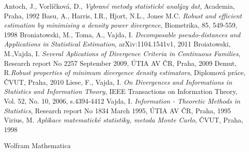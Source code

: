 \begin{thebibliography}{10}

%

Antoch, J., Vorlíčková, D., {\em Vybrané metody statistické analýzy dat}, Academia, Praha, 1992
Basu, A., Harris, I.R., Hjort, N.L., Jones M.C. {\em Robust and efficient estimation by minimising a density power divergence}, Biometrika, 85, 549-559, 1998
Broniatowski, M., Toma, A., Vajda, I. {\em Decomposable pseudo-distances and Applications in Statistical Estimation}, arXiv:1104.1541v1, 2011
Broiatowski, M.,Vajda, I. {\em Several Aplications of Divergence Criteria in Continuous Families}, Research report No 2257 September 2009, ÚTIA AV ČR, Praha, 2009
Demut, R.{\em Robust properties of minimum divergence density estimators}, Diplomová práce, ČVUT, Praha, 2010
Liese, F., Vajda, I. {\em On Divergences and Informations in Statistics and Information Theory}, IEEE Transactions on Information Theory, Vol. 52, No. 10, 2006, s.4394-4412
Vajda, I. {\em Information - Theoretic Methods in Statistics}, Research report No 1834 March 1995, ÚTIA AV ČR, Praha, 1995
Virius, M. {\em Aplikace matematické statistiky, metoda Monte Carlo}, ČVUT, Praha, 1998

Wolfram Mathematica

\end{thebibliography}
